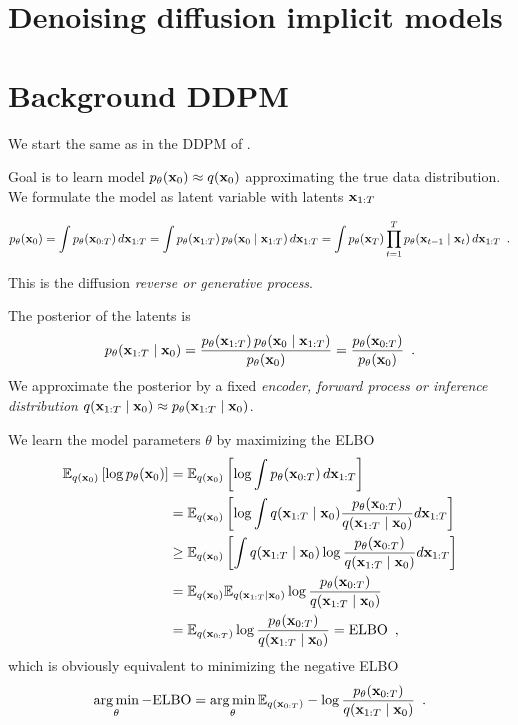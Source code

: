 \clearpage

\section{Denoising diffusion implicit models}\label{sec:ddim}

\begin{notebox}
\end{notebox}

\section{Background DDPM}\label{sec:ddim_ddpm}

We start the same as in the DDPM of \cite{ho_denoising_2020}.

Goal is to learn model $p_{\theta}({\mathbf{x}}_0) \approx q({\mathbf{x}}_0)$ approximating the true data distribution.
We formulate the model as latent variable with latents ${\mathbf{x}}_{1:T}$

\begin{align}
    p_{\theta}({\mathbf{x}}_0) 
    = \int p_{\theta}({\mathbf{x}}_{0:T})\, d{\mathbf{x}}_{1:T} 
    = \int p_{\theta}({\mathbf{x}}_{1:T})\,p_{\theta}({\mathbf{x}}_0 \mid {\mathbf{x}}_{1:T}) \, d{\mathbf{x}}_{1:T} 
    = \int p_{\theta}({\mathbf{x}}_T) \prod_{t=1}^T p_{\theta}({\mathbf{x}}_{t-1} \mid {\mathbf{x}}_{t})\, d{\mathbf{x}}_{1:T} 
    \enspace .
\end{align}

This is the diffusion \textit{reverse or generative process}. 

The posterior of the latents is
\begin{equation}
    p_{\theta}({\mathbf{x}}_{1:T} \mid {\mathbf{x}}_0)
    = \frac{p_{\theta}({\mathbf{x}}_{1:T})\,p_{\theta}({\mathbf{x}}_0 \mid {\mathbf{x}}_{1:T})}{p_{\theta}({\mathbf{x}}_0)}
    = \frac{p_{\theta}({\mathbf{x}}_{0:T})}{p_{\theta}({\mathbf{x}}_0)} \enspace .
\end{equation}
We approximate the posterior by a fixed \textit{encoder, forward process or inference distribution} $q({\mathbf{x}}_{1:T} \mid {\mathbf{x}}_0) \approx p_{\theta}({\mathbf{x}}_{1:T} \mid {\mathbf{x}}_0)$.

We learn the model parameters $\theta$ by maximizing the ELBO
\begin{align}
    \mathbb{E}_{q({\mathbf{x}}_0)} \left[ \log p_{\theta}({\mathbf{x}}_0) \right] & = \mathbb{E}_{q({\mathbf{x}}_0)} \left[\log \int p_{\theta}({\mathbf{x}}_{0:T})\, d{\mathbf{x}}_{1:T} \right] \nonumber \\
    & = \mathbb{E}_{q({\mathbf{x}}_0)} \left[ \log \int q({\mathbf{x}}_{1:T} \mid {\mathbf{x}}_0) \frac{p_{\theta}({\mathbf{x}}_{0:T})}{q({\mathbf{x}}_{1:T} \mid {\mathbf{x}}_0)} d{\mathbf{x}}_{1:T} \right] \nonumber \\
    & \geq \mathbb{E}_{q({\mathbf{x}}_0)} \left[ \int q({\mathbf{x}}_{1:T} \mid {\mathbf{x}}_0) \log  \frac{p_{\theta}({\mathbf{x}}_{0:T})}{q({\mathbf{x}}_{1:T} \mid {\mathbf{x}}_0)} d{\mathbf{x}}_{1:T} \right] \nonumber \\
    & = \mathbb{E}_{q({\mathbf{x}}_0)} \mathbb{E}_{q({\mathbf{x}}_{1:T} \mid {\mathbf{x}}_0)} \log  \frac{p_{\theta}({\mathbf{x}}_{0:T})}{q({\mathbf{x}}_{1:T} \mid {\mathbf{x}}_0)} \nonumber \\
    & = \mathbb{E}_{q({\mathbf{x}}_{0:T})} \log  \frac{p_{\theta}({\mathbf{x}}_{0:T})}{q({\mathbf{x}}_{1:T} \mid {\mathbf{x}}_0)} = \text{ELBO} \enspace ,
\end{align}
which is obviously equivalent to minimizing the negative ELBO
\begin{equation}
    \operatorname*{arg\,min}_{\theta} - \text{ELBO} = \operatorname*{arg\,min}_{\theta} \mathbb{E}_{q({\mathbf{x}}_{0:T})} - \log \frac{p_{\theta}({\mathbf{x}}_{0:T})}{q({\mathbf{x}}_{1:T} \mid {\mathbf{x}}_0)} \enspace .
\end{equation}

